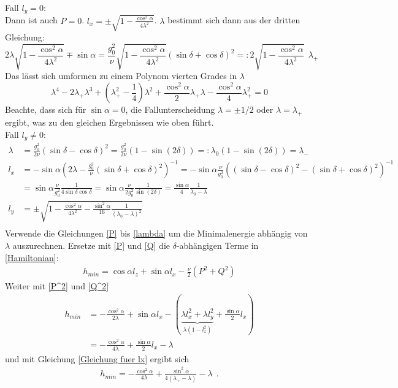 Fall $l_y=0$:\\
Dann ist auch $P=0$. $l_x = \pm \sqrt{1-\frac{\cos^2\alpha}{4\lambda^2}}$. $\lambda$ bestimmt sich dann aus der dritten Gleichung:
\begin{equation*}
  2\lambda \sqrt{1-\frac{\cos^2\alpha}{4\lambda^2}} \mp \sin\alpha = \frac{g_0^2}{\nu} \sqrt{1-\frac{\cos^2\alpha}{4\lambda^2}} (\sin\delta + \cos\delta)^2=: 2\sqrt{1-\frac{\cos^2\alpha}{4\lambda^2}}~~\lambda_+
\end{equation*}
Das lässt sich umformen zu einem Polynom vierten Grades in $\lambda$
\begin{equation*}
  \lambda^4-2\lambda_+ \lambda^3 +(\lambda_+^2-\frac14)\lambda^2 + \frac{\cos^2\alpha}{2}\lambda_+ \lambda -\frac{\cos^2\alpha}{4}\lambda_+^2=0
\end{equation*}
Beachte, dass sich für $\sin\alpha = 0$, die Fallunterscheidung $\lambda=\pm1/2$ oder $\lambda = \lambda_+$ ergibt, was zu den gleichen Ergebnissen wie oben führt.
\\

Fall $l_y \neq 0$:
\begin{align*}
  \lambda &= \frac {g_0^2}{2\nu}(\sin\delta -\cos\delta)^2 = \frac {g_0^2}{2\nu}(1-\sin(2\delta))=:\lambda_0(1-\sin(2\delta)) = \lambda_-\\
  l_x &= -\sin\alpha \left( 2\lambda - \frac{g_0^2}{\nu}(\sin\delta + \cos\delta)^2 \right)^{-1} = -\sin\alpha \frac{\nu}{g_0^2} \left( (\sin\delta - \cos\delta)^2 - (\sin\delta + \cos\delta)^2\right)^{-1}\\
  &= \sin\alpha \frac{\nu}{g_0^2} \frac{1}{4\sin\delta\cos\delta} = \sin\alpha \frac{\nu}{ 2 g_0^2} \frac{1}{\sin(2\delta)} =  \frac{\sin\alpha}{4} \frac{1}{\lambda_0 -\lambda}\\
  l_y &= \pm \sqrt{1 - \frac{\cos^2\alpha}{4\lambda^2} - \frac{\sin^2\alpha}{16} \frac{1}{(\lambda_0-\lambda)^2}}\\
\end{align*}
Verwende die Gleichungen \eqref{P} bis \eqref{lambda} um die Minimalenergie abhängig von $\lambda$ auszurechnen. Ersetze mit \eqref{P} und \eqref{Q} die $\delta$-abhängigen Terme in \eqref{Hamiltonian}:
\begin{align*}
 h_{min}  = \cos\alpha l_z + \sin\alpha l_x - \frac{\nu}{2}(P^2+Q^2)
\end{align*}
Weiter mit \eqref{P^2} und \eqref{Q^2} 
\begin{align*}
  h_{min} &= -\frac{\cos^2\alpha}{2\lambda} + \sin\alpha l_x - (\underbrace{\lambda l_x^2 + \lambda l_y^2}_{\lambda(1-l_z^2)} + \frac{\sin\alpha}{2} l_x)\\
  &= - \frac{\cos^2\alpha}{4\lambda} + \frac{\sin\alpha}{2} l_x - \lambda 
\end{align*}
und mit Gleichung \eqref{Gleichung fuer lx} ergibt sich
\begin{align}
  h_{min} = -\frac{\cos^2\alpha}{4\lambda} + \frac{\sin^2\alpha}{4(\lambda_+ - \lambda)} - \lambda~~.
\end{align}
